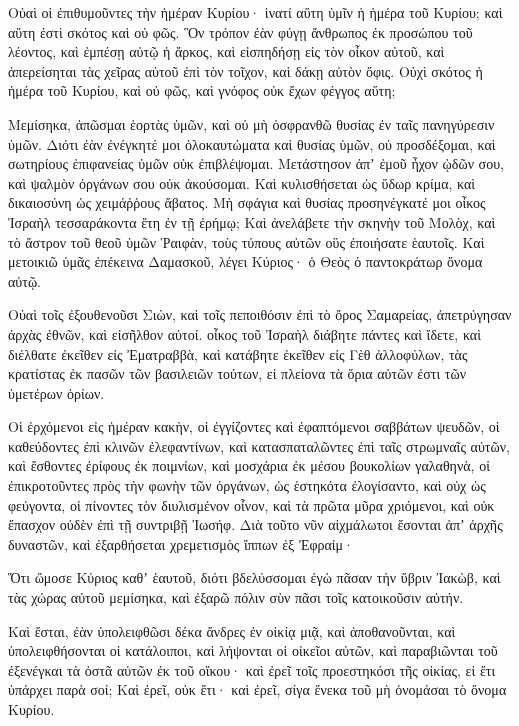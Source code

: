 \begin{spacing}{1.1}
\begin{multicols}{2}
Οὐαὶ οἱ ἐπιθυμοῦντες τὴν ἡμέραν Κυρίου· ἱνατί αὕτη ὑμῖν ἡ ἡμέρα τοῦ Κυρίου; καὶ αὕτη ἐστὶ σκότος καὶ οὐ φῶς.
Ὃν τρόπον ἐὰν φύγῃ ἄνθρωπος ἐκ προσώπου τοῦ λέοντος, καὶ ἐμπέσῃ αὐτῷ ἡ ἄρκος, καὶ εἰσπηδήσῃ εἰς τὸν οἶκον αὐτοῦ, καὶ ἀπερείσηται τὰς χεῖρας αὐτοῦ ἐπὶ τὸν τοῖχον, καὶ δάκῃ αὐτὸν ὄφις.
Οὐχὶ σκότος ἡ ἡμέρα τοῦ Κυρίου, καὶ οὐ φῶς, καὶ γνόφος οὐκ ἔχων φέγγος αὕτη;

Μεμίσηκα, ἀπῶσμαι ἑορτὰς ὑμῶν, καὶ οὐ μὴ ὀσφρανθῶ θυσίας ἐν ταῖς πανηγύρεσιν ὑμῶν.
Διότι ἐὰν ἐνέγκητέ μοι ὁλοκαυτώματα καὶ θυσίας ὑμῶν, οὐ προσδέξομαι, καὶ σωτηρίους ἐπιφανείας ὑμῶν οὐκ ἐπιβλέψομαι.
Μετάστησον ἀπʼ ἐμοῦ ἦχον ᾠδῶν σου, καὶ ψαλμὸν ὀργάνων σου οὐκ ἀκούσομαι.
Καὶ κυλισθήσεται ὡς ὕδωρ κρίμα, καὶ δικαιοσύνη ὡς χειμάῤῥους ἄβατος.
Μὴ σφάγια καὶ θυσίας προσηνέγκατέ μοι οἶκος Ἰσραὴλ τεσσαράκοντα ἔτη ἐν τῇ ἐρήμῳ;
Καὶ ἀνελάβετε τὴν σκηνὴν τοῦ Μολὸχ, καὶ τὸ ἄστρον τοῦ θεοῦ ὑμῶν Ῥαιφὰν, τοὺς τύπους αὐτῶν οὓς ἐποιήσατε ἑαυτοῖς.
Καὶ μετοικιῶ ὑμᾶς ἐπέκεινα Δαμασκοῦ, λέγει Κύριος· ὁ Θεὸς ὁ παντοκράτωρ ὄνομα αὐτῷ.

Οὐαὶ τοῖς ἐξουθενοῦσι Σιὼν, καὶ τοῖς πεποιθόσιν ἐπὶ τὸ ὄρος Σαμαρείας, ἀπετρύγησαν ἀρχὰς ἐθνῶν, καὶ εἰσῆλθον αὐτοί. οἶκος τοῦ Ἰσραὴλ
διάβητε πάντες καὶ ἴδετε, καὶ διέλθατε ἐκεῖθεν εἰς Ἐματραββὰ, καὶ κατάβητε ἐκεῖθεν εἰς Γὲθ ἀλλοφύλων, τὰς κρατίστας ἐκ πασῶν τῶν βασιλειῶν τούτων, εἰ πλείονα τὰ ὅρια αὐτῶν ἐστι τῶν ὑμετέρων ὁρίων.

Οἱ ἐρχόμενοι εἰς ἡμέραν κακὴν, οἱ ἐγγίζοντες καὶ ἐφαπτόμενοι σαββάτων ψευδῶν,
οἱ καθεύδοντες ἐπὶ κλινῶν ἐλεφαντίνων, καὶ κατασπαταλῶντες ἐπὶ ταῖς στρωμναῖς αὐτῶν, καὶ ἔσθοντες ἐρίφους ἐκ ποιμνίων, καὶ μοσχάρια ἐκ μέσου βουκολίων γαλαθηνὰ,
οἱ ἐπικροτοῦντες πρὸς τὴν φωνὴν τῶν ὀργάνων, ὡς ἑστηκότα ἐλογίσαντο, καὶ οὐχ ὡς φεύγοντα,
οἱ πίνοντες τὸν διυλισμένον οἶνον, καὶ τὰ πρῶτα μῦρα χριόμενοι, καὶ οὐκ ἔπασχον οὐδὲν ἐπὶ τῇ συντριβῇ Ἰωσήφ.
Διὰ τοῦτο νῦν αἰχμάλωτοι ἔσονται ἀπʼ ἀρχῆς δυναστῶν, καὶ ἐξαρθήσεται χρεμετισμὸς ἵππων ἐξ Ἐφραίμ·

Ὅτι ὤμοσε Κύριος καθʼ ἑαυτοῦ, διότι βδελύσσομαι ἐγὼ πᾶσαν τὴν ὕβριν Ἰακὼβ, καὶ τὰς χώρας αὐτοῦ μεμίσηκα, καὶ ἐξαρῶ πόλιν σὺν πᾶσι τοῖς κατοικοῦσιν αὐτήν.

Καὶ ἔσται, ἐὰν ὑπολειφθῶσι δέκα ἄνδρες ἐν οἰκίᾳ μιᾷ, καὶ ἀποθανοῦνται, καὶ ὑπολειφθήσονται οἱ κατάλοιποι,
καὶ λήψονται οἱ οἰκεῖοι αὐτῶν, καὶ παραβιῶνται τοῦ ἐξενέγκαι τὰ ὀστᾶ αὐτῶν ἐκ τοῦ οἴκου· καὶ ἐρεῖ τοῖς προεστηκόσι τῆς οἰκίας, εἰ ἔτι ὑπάρχει παρὰ σοί; Καὶ ἐρεῖ, οὐκ ἔτι· καὶ ἐρεῖ, σίγα ἕνεκα τοῦ μὴ ὀνομάσαι τὸ ὄνομα Κυρίου.


\end{multicols}
\end{spacing}

